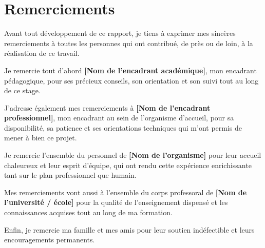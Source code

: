 \chapter*{Remerciements}

Avant tout développement de ce rapport, je tiens à exprimer mes sincères remerciements à toutes les personnes qui ont contribué, de près ou de loin, à la réalisation de ce travail.

\vspace{0.5cm}

Je remercie tout d'abord \textbf{[Nom de l'encadrant académique]}, mon encadrant pédagogique, pour ses précieux conseils, son orientation et son suivi tout au long de ce stage.

\vspace{0.5cm}

J'adresse également mes remerciements à \textbf{[Nom de l'encadrant professionnel]}, mon encadrant au sein de l'organisme d'accueil, pour sa disponibilité, sa patience et ses orientations techniques qui m'ont permis de mener à bien ce projet.

\vspace{0.5cm}

Je remercie l'ensemble du personnel de \textbf{[Nom de l'organisme]} pour leur accueil chaleureux et leur esprit d'équipe, qui ont rendu cette expérience enrichissante tant sur le plan professionnel que humain.

\vspace{0.5cm}

Mes remerciements vont aussi à l'ensemble du corps professoral de \textbf{[Nom de l'université / école]} pour la qualité de l'enseignement dispensé et les connaissances acquises tout au long de ma formation.

\vspace{0.5cm}

Enfin, je remercie ma famille et mes amis pour leur soutien indéfectible et leurs encouragements permanents.

\newpage
